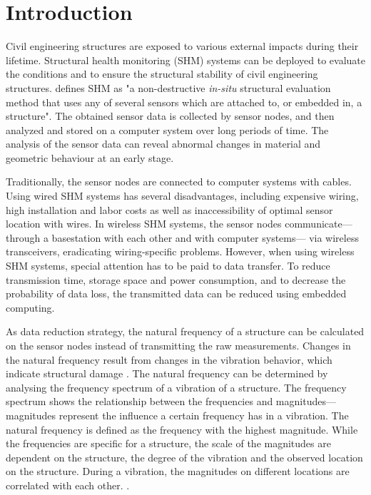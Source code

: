 \documentclass[12pt,a4paper]{scrartcl}
\begin{document}
\section*{Introduction}

Civil engineering structures are exposed to various external impacts during their lifetime. 
Structural health monitoring (SHM) systems can be deployed to evaluate the conditions and to ensure the structural stability of civil engineering structures.
\citet{BisbySHM} defines SHM as "a non-destructive \textit{in-situ} structural evaluation method that uses any of several sensors which are attached to, or embedded in, a structure".
The obtained sensor data is collected by sensor nodes, and then analyzed and stored on a computer system over long periods of time. 
The analysis of the sensor data can reveal abnormal changes in material and geometric behaviour at an early stage.

Traditionally, the sensor nodes are connected to computer systems with cables.
Using wired SHM systems has several disadvantages, including expensive wiring, high installation and labor costs as well as inaccessibility of optimal sensor location with wires.
In wireless SHM systems, the sensor nodes communicate---through a basestation with each other and with computer systems--- via wireless transceivers, eradicating wiring-specific problems. However, when using wireless SHM systems, special attention has to be paid to data transfer. 
To reduce transmission time, storage space and power consumption, and to decrease the probability of data loss, the transmitted data can be reduced using embedded computing.

As data reduction strategy, the natural frequency of a structure can be calculated on the sensor nodes instead of transmitting the raw measurements.
Changes in the natural frequency result from changes in the vibration behavior, which indicate structural damage \citep{salawu1997detection}.
The natural frequency can be determined by analysing the frequency spectrum of a vibration of a structure.
The frequency spectrum shows the relationship between the frequencies and magnitudes---magnitudes represent the influence a certain frequency has in a vibration.
The natural frequency is defined as the frequency with the highest magnitude.
While the frequencies are specific for a structure, the scale of the magnitudes are dependent on the structure, the degree of the vibration and the observed location on the structure.
During a vibration, the magnitudes on different locations are correlated with each other.
\citep{rao2011fast}.
\end{document}
